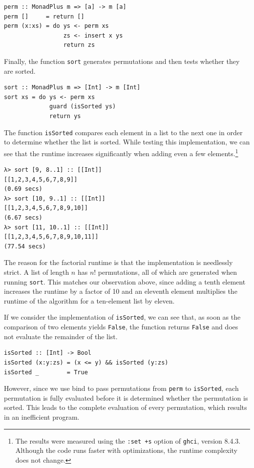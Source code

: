 \documentclass[a4paper, 11pt, fleqn, twoside, abstract=on]{scrreprt}
\newcommand{\hinl}[1]{\texttt{#1}}
\begin{document}
\begin{verbatim}
perm :: MonadPlus m => [a] -> m [a]
perm []     = return []
perm (x:xs) = do ys <- perm xs
                 zs <- insert x ys
                 return zs
\end{verbatim}
\noindent
Finally, the function \hinl{sort} generates permutations and then tests whether they are sorted.

\begin{verbatim}
sort :: MonadPlus m => [Int] -> m [Int]
sort xs = do ys <- perm xs
             guard (isSorted ys)
             return ys
\end{verbatim}

The function \hinl{isSorted} compares each element in a list to the next one in order to determine whether the list is sorted.
While testing this implementation, we can see that the runtime increases significantly when adding even a few elements.\footnote{The results were measured using the \texttt{:set +s} option of \texttt{ghci}, version 8.4.3. Although the code runs faster with optimizations, the runtime complexity does not change.}

\begin{verbatim}
λ> sort [9, 8..1] :: [[Int]]
[[1,2,3,4,5,6,7,8,9]]
(0.69 secs)
λ> sort [10, 9..1] :: [[Int]]
[[1,2,3,4,5,6,7,8,9,10]]
(6.67 secs)
λ> sort [11, 10..1] :: [[Int]]
[[1,2,3,4,5,6,7,8,9,10,11]]
(77.54 secs)
\end{verbatim}

The reason for the factorial runtime is that the implementation is needlessly strict.
A list of length $n$  has $n!$ permutations, all of which are generated when running \hinl{sort}.
This matches our observation above, since adding a tenth element increases the runtime by a factor of 10 and an eleventh element multiplies the runtime of the algorithm for a ten-element list by eleven.

If we consider the implementation of \hinl{isSorted}, we can see that, as soon as the comparison of two elements yields \hinl{False}, the function returns \hinl{False} and does not evaluate the remainder of the list.

\begin{verbatim}
isSorted :: [Int] -> Bool
isSorted (x:y:zs) = (x <= y) && isSorted (y:zs)
isSorted _        = True
\end{verbatim}

However, since we use bind to pass permutations from \hinl{perm} to \hinl{isSorted}, each permutation is fully evaluated before it is determined whether the permutation is sorted.
This leads to the complete evaluation of every permutation, which results in an inefficient program.
\end{document}
